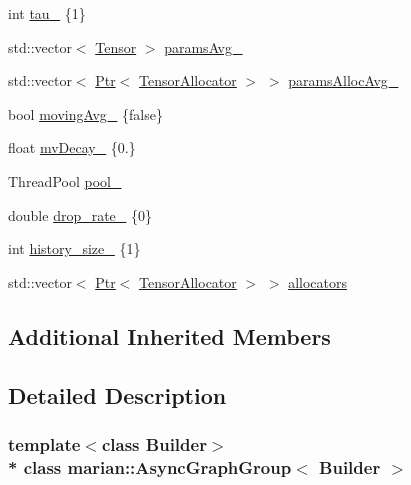 \begin{DoxyCompactItemize}
\item 
int \hyperlink{classmarian_1_1AsyncGraphGroup_a1024a5bc27269a0ab98a2c9b6b991f71}{tau\+\_\+} \{1\}
\item 
std\+::vector$<$ \hyperlink{namespacemarian_a88b71ec34bb354564cddc24eb80f7e14}{Tensor} $>$ \hyperlink{classmarian_1_1AsyncGraphGroup_a203413621a666e7e5c9394a3a02498f4}{params\+Avg\+\_\+}
\item 
std\+::vector$<$ \hyperlink{namespacemarian_ad1a373be43a00ef9ce35666145137b08}{Ptr}$<$ \hyperlink{classmarian_1_1TensorAllocator}{Tensor\+Allocator} $>$ $>$ \hyperlink{classmarian_1_1AsyncGraphGroup_af6fd0e5be552825e8190fcb17fe63671}{params\+Alloc\+Avg\+\_\+}
\item 
bool \hyperlink{classmarian_1_1AsyncGraphGroup_a96d6309b1924939d4b77ef1ed3a119d7}{moving\+Avg\+\_\+} \{false\}
\item 
float \hyperlink{classmarian_1_1AsyncGraphGroup_a63554b987fc4b0dcb408cf3987758d29}{mv\+Decay\+\_\+} \{0.\}
\item 
Thread\+Pool \hyperlink{classmarian_1_1AsyncGraphGroup_a1e7cb229894520315af6d9036daeb957}{pool\+\_\+}
\item 
double \hyperlink{classmarian_1_1AsyncGraphGroup_a774969ba69bab8fbd48e6454bbe7e54c}{drop\+\_\+rate\+\_\+} \{0\}
\item 
int \hyperlink{classmarian_1_1AsyncGraphGroup_a0958c1384fc7486dd4f739d69c9ac636}{history\+\_\+size\+\_\+} \{1\}
\item 
std\+::vector$<$ \hyperlink{namespacemarian_ad1a373be43a00ef9ce35666145137b08}{Ptr}$<$ \hyperlink{classmarian_1_1TensorAllocator}{Tensor\+Allocator} $>$ $>$ \hyperlink{classmarian_1_1AsyncGraphGroup_a0ea898056bf8730db2389efbfc0eda89}{allocators}
\end{DoxyCompactItemize}
\subsection*{Additional Inherited Members}


\subsection{Detailed Description}
\subsubsection*{template$<$class Builder$>$\\*
class marian\+::\+Async\+Graph\+Group$<$ Builder $>$}



